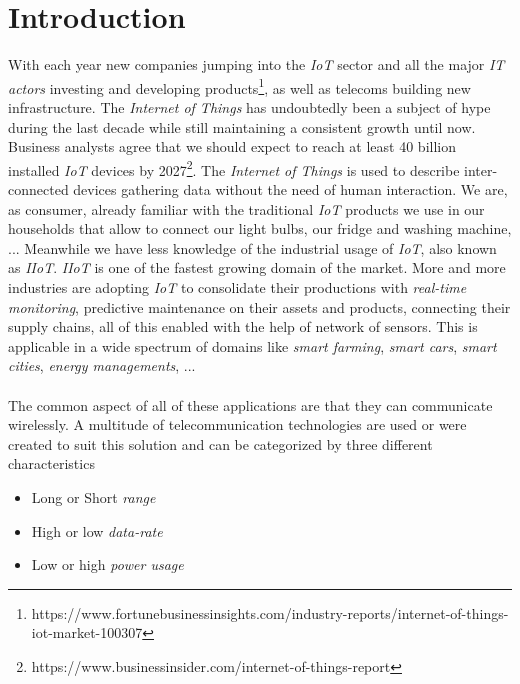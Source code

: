 \section{Introduction}

With each year new companies jumping into the \emph{IoT} sector and all the major \emph{IT actors} investing and developing products\footnote{https://www.fortunebusinessinsights.com/industry-reports/internet-of-things-iot-market-100307}, as well as telecoms building new infrastructure. The \emph{Internet of Things} has undoubtedly been a subject of hype during the last decade while still maintaining a consistent growth until now. 
Business analysts agree that we should expect to reach at least 40 billion installed \emph{IoT} devices by 2027\footnote{https://www.businessinsider.com/internet-of-things-report}. The \emph{Internet of Things} is used to describe inter-connected devices gathering data without the need of human interaction.
We are, as consumer, already familiar with the traditional \emph{IoT} products we use in our households that allow to connect our light bulbs, our fridge and washing machine, ...
Meanwhile we have less knowledge of the industrial usage of \emph{IoT}, also known as \emph{IIoT}. \emph{IIoT} is one of the fastest growing domain of the market. More and more industries are adopting \emph{IoT}  to consolidate their productions with \emph{real-time monitoring}, predictive maintenance on their assets and products, connecting their supply chains, all of this enabled with the help of network of sensors.
This is applicable in a wide spectrum of domains like \emph{smart farming}, \emph{smart cars}, \emph{smart cities}, \emph{energy managements}, ...

\paragraph{}

The common aspect of all of these applications are that they can communicate wirelessly.
A multitude of telecommunication technologies are used or were created to suit this solution and can be categorized by three different characteristics

\begin{itemize}
    \item Long or Short \emph{range}
    \item High or low \emph{data-rate}
    \item Low or high \emph{power usage} 
\end{itemize}

